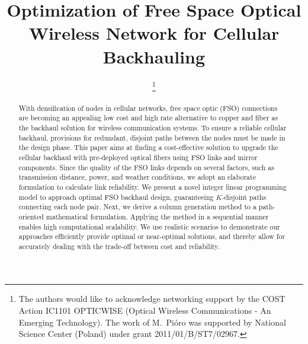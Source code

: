 \documentclass[onecolumn,11pt,draftclsnofoot]{IEEEtran}
\begin{document}
\title{Optimization of Free Space Optical Wireless Network for Cellular Backhauling}

\author{

\thanks{The authors would like to acknowledge networking support by the COST Action IC1101 OPTICWISE (Optical Wireless Communications - An Emerging Technology). The work of M.~Pi\'{o}ro was supported by National Science Center (Poland) under grant 2011/01/B/ST7/02967.}
}

\maketitle

\begin{abstract}

With densification of nodes in cellular networks, free space optic (FSO) connections are becoming an appealing low cost and high rate alternative to copper and fiber as the backhaul solution for wireless communication systems. To ensure a reliable cellular backhaul, provisions for redundant, disjoint paths between the nodes must be made in the design phase. This paper aims at finding a cost-effective solution to upgrade the cellular backhaul with pre-deployed optical fibers using FSO links and mirror components. Since the quality of the FSO links depends on several factors, such as transmission distance, power, and weather conditions, we adopt an elaborate formulation to calculate link reliability. We present a novel integer linear programming model to approach optimal FSO backhaul design, guaranteeing $K$-disjoint paths connecting each node pair. Next, we derive a column generation method to a path-oriented mathematical formulation. Applying the method in a sequential manner enables high computational scalability. We use realistic scenarios to demonstrate our approaches efficiently provide optimal or near-optimal solutions, and thereby allow for accurately dealing with the trade-off between cost and reliability.

\end{abstract}
\end{document}
